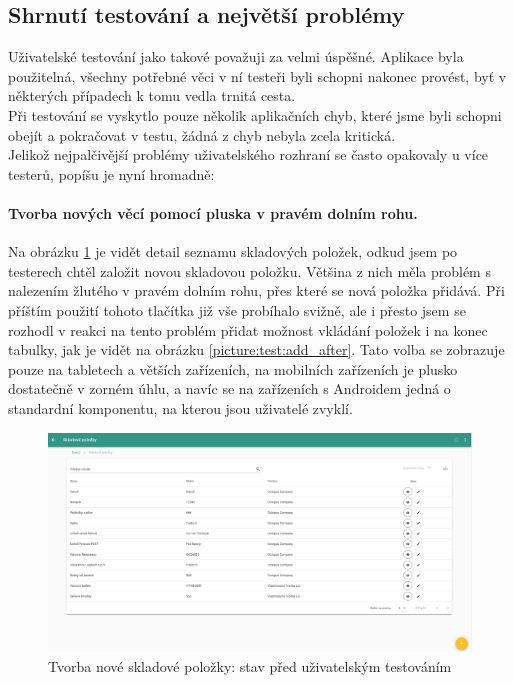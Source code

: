 
\subsection{Shrnutí testování a největší problémy}

Uživatelské testování jako takové považuji za velmi úspěšné. Aplikace byla použitelná, všechny potřebné věci v ní testeři byli schopni nakonec provést, byť v některých případech k tomu vedla trnitá cesta.\\
Při testování se vyskytlo pouze několik aplikačních chyb, které jsme byli schopni obejít a pokračovat v testu, žádná z chyb nebyla zcela kritická.\\

Jelikož nejpalčivější problémy uživatelského rozhraní se často opakovaly u více testerů, popíšu je nyní hromadně:

\paragraph{Tvorba nových věcí pomocí pluska v pravém dolním rohu.} Na obrázku \ref{picture:test:add_before} je vidět detail seznamu skladových položek, odkud jsem po testerech chtěl založit novou skladovou položku. Většina z nich měla problém s nalezením žlutého  v pravém dolním rohu, přes které se nová položka přidává. Při příštím použití tohoto tlačítka již vše probíhalo svižně, ale i přesto jsem se rozhodl v reakci na tento problém přidat možnost vkládání položek i na konec tabulky, jak je vidět na obrázku \ref{picture:test:add_after}. Tato volba se zobrazuje pouze na tabletech a větších zařízeních, na mobilních zařízeních je plusko dostatečně v zorném úhlu, a navíc se na zařízeních s Androidem jedná o standardní komponentu, na kterou jsou uživatelé zvyklí.

\begin{figure}[h]
\includegraphics[width=\textwidth]{../png/app_testing/plus_before.png}
\caption{Tvorba nové skladové položky: stav před uživatelským testováním} \label{picture:test:add_before}
\end{figure}

